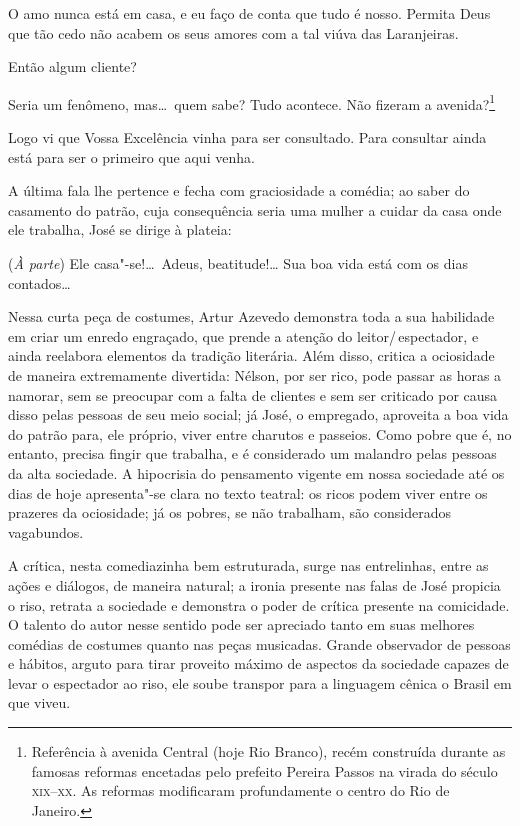 \begin{hedraquote} 
 O amo nunca está em casa, e eu faço de conta que tudo é nosso.
Permita Deus que tão cedo não acabem os seus amores com a tal viúva das
Laranjeiras.

 Então algum cliente?

 Seria um fenômeno, mas\ldots\ quem sabe? Tudo acontece. Não fizeram a
avenida?\footnote{ Referência à avenida Central (hoje Rio Branco),
recém construída durante as famosas reformas encetadas pelo prefeito
Pereira Passos na virada do século \textsc{xix}--\textsc{xx}. As reformas modificaram
profundamente o centro do Rio de Janeiro.}

 Logo vi que Vossa Excelência vinha para ser consultado. Para
consultar ainda está para ser o primeiro que aqui venha.
\end{hedraquote} 

A última fala lhe pertence e fecha com graciosidade a comédia; ao saber
do casamento do patrão, cuja consequência seria uma mulher a cuidar da
casa onde ele trabalha, José se dirige à plateia:

\begin{hedraquote} 
 (\textit{À parte}) Ele casa"-se!\ldots\ Adeus, beatitude!\ldots
Sua boa vida está com os dias contados\ldots 
\end{hedraquote} 

Nessa curta peça de costumes, Artur Azevedo demonstra toda a sua
habilidade em criar um enredo engraçado, que prende a atenção do
leitor/\,espectador, e ainda reelabora elementos da tradição literária.
Além disso, critica a ociosidade de maneira extremamente divertida:
Nélson, por ser rico, pode passar as horas a namorar, sem se preocupar
com a falta de clientes e sem ser criticado por causa disso pelas
pessoas de seu meio social; já José, o empregado, aproveita a boa vida
do patrão para, ele próprio, viver entre charutos e passeios. Como
pobre que é, no entanto, precisa fingir que trabalha, e é considerado
um malandro pelas pessoas da alta sociedade. A hipocrisia do pensamento
vigente em nossa sociedade até os dias de hoje apresenta"-se clara no
texto teatral: os ricos podem viver entre os prazeres da ociosidade; já
os pobres, se não trabalham, são considerados vagabundos.

A crítica, nesta comediazinha bem estruturada, surge nas entrelinhas,
entre as ações e diálogos, de maneira natural; a ironia presente nas
falas de José propicia o riso, retrata a sociedade e demonstra o poder
de crítica presente na comicidade. O talento do autor nesse sentido
pode ser apreciado tanto em suas melhores comédias de costumes quanto
nas peças musicadas. Grande observador de pessoas e hábitos, arguto
para tirar proveito máximo de aspectos da sociedade capazes de levar o
espectador ao riso, ele soube transpor para a linguagem cênica o Brasil
em que viveu. 

